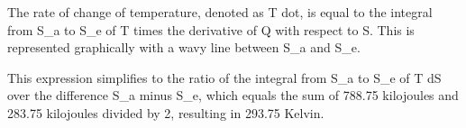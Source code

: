 The rate of change of temperature, denoted as T dot, is equal to the integral from S_a to S_e of T times the derivative of Q with respect to S. This is represented graphically with a wavy line between S_a and S_e.

This expression simplifies to the ratio of the integral from S_a to S_e of T dS over the difference S_a minus S_e, which equals the sum of 788.75 kilojoules and 283.75 kilojoules divided by 2, resulting in 293.75 Kelvin.